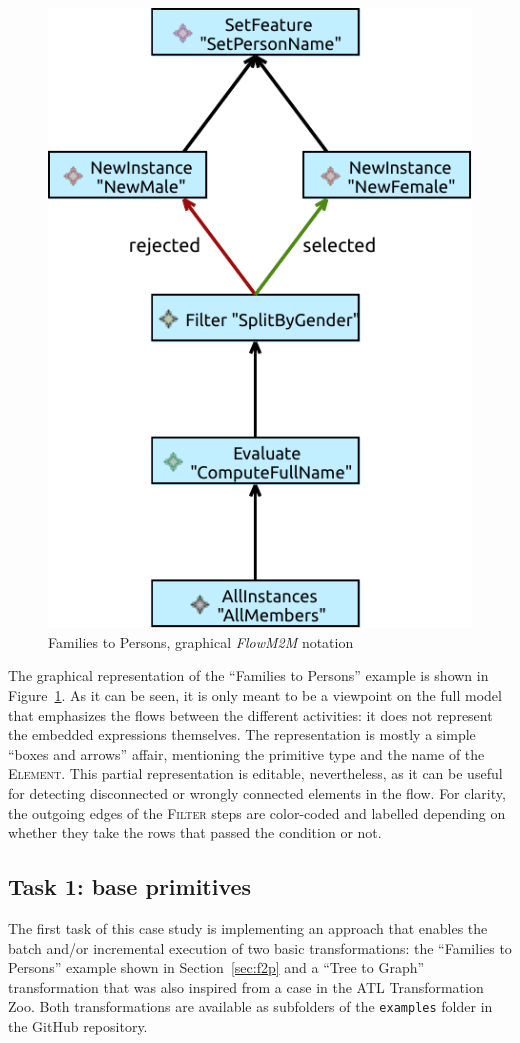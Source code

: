 \documentclass[a4paper]{scrartcl}
\newcommand*{\class}[1]{\textsc{#1}}
\newcommand{\FlowMM}{\emph{FlowM2M}\xspace}
\newcommand*{\file}[1]{\texttt{#1}}
\begin{document}
\begin{figure}
  \centering
  \includegraphics[width=.4\textwidth]{families2persons}
  \caption{Families to Persons, graphical \FlowMM notation}
  \label{fig:f2p}
\end{figure}

The graphical representation of the ``Families to Persons'' example is
shown in Figure~\ref{fig:f2p}. As it can be seen, it is only meant to
be a viewpoint on the full model that emphasizes the flows between the
different activities: it does not represent the embedded expressions
themselves. The representation is mostly a simple ``boxes and arrows''
affair, mentioning the primitive type and the name of the
\class{Element}. This partial representation is editable,
nevertheless, as it can be useful for detecting disconnected or
wrongly connected elements in the flow. For clarity, the outgoing
edges of the \class{Filter} steps are color-coded and labelled
depending on whether they take the rows that passed the condition or
not.

\subsection{Task 1: base primitives}
\label{sec:baseprim}


The first task of this case study is implementing an approach that
enables the batch and/or incremental execution of two basic
transformations: the ``Families to Persons'' example shown in
Section~\ref{sec:f2p} and a ``Tree to Graph'' transformation that was
also inspired from a case in the ATL Transformation Zoo. Both
transformations are available as subfolders of the \file{examples}
folder in the GitHub repository.
\end{document}
